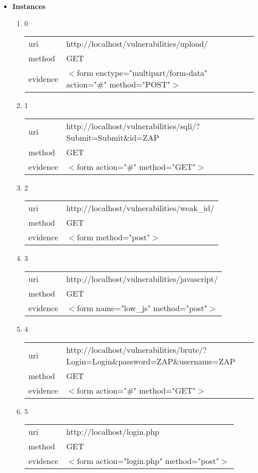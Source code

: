 \documentclass[10pt]{article}
\begin{document}
\begin{itemize}
\item[] \textbf{Instances}
\begin{enumerate}
\item[] 0
\begin{tabular}{| l | p{14cm}}
uri & http://localhost/vulnerabilities/upload/ \\
method & GET \\
evidence & $<$form enctype="multipart/form-data" action="\#" method="POST"$>$ \\
\end{tabular}
\item[] 1
\begin{tabular}{| l | p{14cm}}
uri & http://localhost/vulnerabilities/sqli/?Submit=Submit\&id=ZAP \\
method & GET \\
evidence & $<$form action="\#" method="GET"$>$ \\
\end{tabular}
\item[] 2
\begin{tabular}{| l | p{14cm}}
uri & http://localhost/vulnerabilities/weak{\_}id/ \\
method & GET \\
evidence & $<$form method="post"$>$ \\
\end{tabular}
\item[] 3
\begin{tabular}{| l | p{14cm}}
uri & http://localhost/vulnerabilities/javascript/ \\
method & GET \\
evidence & $<$form name="low{\_}js" method="post"$>$ \\
\end{tabular}
\item[] 4
\begin{tabular}{| l | p{14cm}}
uri & http://localhost/vulnerabilities/brute/?Login=Login\&password=ZAP\&username=ZAP \\
method & GET \\
evidence & $<$form action="\#" method="GET"$>$ \\
\end{tabular}
\item[] 5
\begin{tabular}{| l | p{14cm}}
uri & http://localhost/login.php \\
method & GET \\
evidence & $<$form action="login.php" method="post"$>$ \\

\end{tabular}
\end{enumerate}
\end{itemize}
\end{document}
